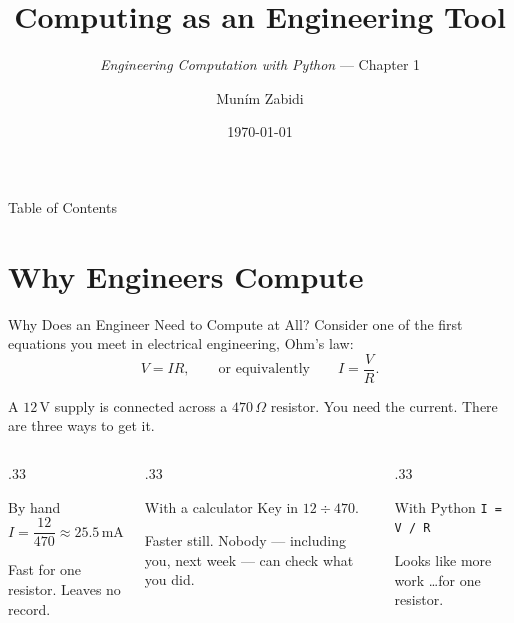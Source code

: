 \documentclass[9pt,aspectratio=169,xcolor=table]{beamer}
\title{Computing as an Engineering Tool}
\subtitle{\emph{Engineering Computation with Python} --- Chapter 1}
\author{Mun\'{i}m Zabidi}
\institute{\color{primary}Faculty of Electrical Engineering, Universiti Teknologi Malaysia}
\date{\today}
\begin{document}
\titlepage

\begin{frame}{Table of Contents}
    \tableofcontents
\end{frame}

\section{Why Engineers Compute}

\begin{frame}{Why Does an Engineer Need to Compute at All?}
    \leavevmode
    Consider one of the first equations you meet in electrical engineering,
    Ohm's law:
    \[
    V = IR, \qquad\text{or equivalently}\qquad I = \frac{V}{R}.
    \]

    \vspace{2mm}
    A $12\,\text{V}$ supply is connected across a $470\,\Omega$ resistor.
    You need the current. There are three ways to get it.

    \vspace{3mm}
    \begin{columns}[t]
        \begin{column}{.33\textwidth}
            \begin{block}{By hand}
                \small
                $I = \dfrac{12}{470} \approx 25.5\,\text{mA}$

                \vspace{1mm}
                Fast for one resistor. Leaves no record.
            \end{block}
        \end{column}
        \begin{column}{.33\textwidth}
            \begin{block}{With a calculator}
                \small
                Key in $12 \div 470$.

                \vspace{1mm}
                Faster still. Nobody --- including you, next week --- can
                check what you did.
            \end{block}
        \end{column}
        \begin{column}{.33\textwidth}
            \begin{block}{With Python}
                \small
                \texttt{I = V / R}

                \vspace{1mm}
                Looks like more work \ldots for one resistor.
            \end{block}
        \end{column}
    \end{columns}
\end{frame}
\end{document}
